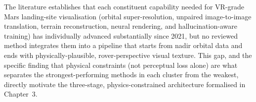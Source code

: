 The literature establishes that each constituent capability needed for VR-grade Mars landing-site visualisation (orbital super-resolution, unpaired image-to-image translation, terrain reconstruction, neural rendering, and hallucination-aware training) has individually advanced substantially since 2021, but no reviewed method integrates them into a pipeline that starts from nadir orbital data and ends with physically-plausible, rover-perspective visual texture. This gap, and the specific finding that physical constraints (not perceptual loss alone) are what separates the strongest-performing methods in each cluster from the weakest, directly motivate the three-stage, physics-constrained architecture formalised in Chapter~3.
